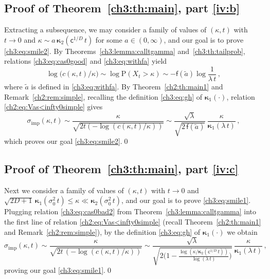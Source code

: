 \documentclass[a4paper,reqno,11pt]{amsart}
\numberwithin{equation}{section}
\renewcommand{\tilde}{\widetilde}          %
\newcommand{\PEfont}{\mathrm}
\renewcommand{\P}{\ensuremath{\PEfont P}}
\newcommand\sfc{\mathsf{c}}
\newcommand\sff{\mathsf{f}}
\newcommand\imp{\mathrm{imp}}
\newcommand\bkappa{\boldsymbol{\kappa}}
\begin{document}
\subsection{Proof of Theorem~\ref{ch3:th:main}, part \eqref{iv:b}}

Extracting a subsequence, we
may consider a family of values of $(\kappa,t)$ with $t\to 0$ and
$\kappa \sim a \, \bkappa_2( \sfc^{1/D} \, t)$ for some $a \in (0,\infty)$,
and our goal is to prove \eqref{ch3:eq:smile2}.
By Theorems~\ref{ch3:lemma:calltgamma}
and~\ref{ch3:th:tailprob},
relations \eqref{ch3:eq:cas0good} and \eqref{ch3:eq:withfa} yield
\begin{equation*}
	\log \big( c(\kappa,t)/\kappa \big) 
	\sim \log \P(X_t > \kappa)\sim 
	- \sff( \tilde a) \log \frac{1}{ \lambda \, t} \,,
\end{equation*}
where $\tilde a$ is defined in \eqref{ch3:eq:withfa}.
By Theorem~\ref{ch2:th:main1} and Remark~\ref{ch2:rem:simple},
recalling the definition \eqref{ch3:eq:gh} of $\bkappa_1(\cdot)$,
relation \eqref{ch2:eq:Vas<infty0simple} gives
\begin{equation*}
 \sigma_\imp(\kappa,t) \sim 
 \frac{\kappa}{\sqrt{2t ( - \log ( c(\kappa,t) / \kappa ) )}} \sim
 \frac{\sqrt{\lambda}}{\sqrt{2 \, \sff( \tilde a)}} \, \frac{\kappa }
 {\bkappa_1(\lambda \, t)}\, ,
\end{equation*}
which proves our goal \eqref{ch3:eq:smile2}.\qed


\subsection{Proof of Theorem~\ref{ch3:th:main}, part \eqref{iv:c}}

Next we consider a family of values of $(\kappa,t)$ with $t\to 0$ and
$\sqrt{2D+1} \, \bkappa_1(\sigma_0^2 \, t) \leq \kappa \ll \bkappa_2(\sigma_0^2 \, t)$,
and our goal is to prove \eqref{ch3:eq:smile1}.
Plugging relation \eqref{ch3:eq:cas0bad2} from Theorem~\ref{ch3:lemma:calltgamma}
into the first line of relation \eqref{ch2:eq:Vas<infty0simple}
(recall Theorem~\ref{ch2:th:main1} and Remark~\ref{ch2:rem:simple}),
by the definition \eqref{ch3:eq:gh} of $\bkappa_1(\cdot)$ we obtain
\begin{equation*}
 \sigma_\imp(\kappa,t) \sim \frac{\kappa}{\sqrt{2t\, ( - \log ( c(\kappa,t) / \kappa ) )}}
	\sim \frac{ \sqrt{\lambda}}{\sqrt{2
	\Big(1- \frac{\log
	\left( \kappa / \bkappa_2(\sfc^{1/D}\,t) \right)}{\log
	(\lambda\,  t)} \Big) }}  \,
  \frac{\kappa}{\bkappa_1( \lambda \, t)}  \,,
\end{equation*}
proving our goal \eqref{ch3:eq:smile1}.\qed
\end{document}
